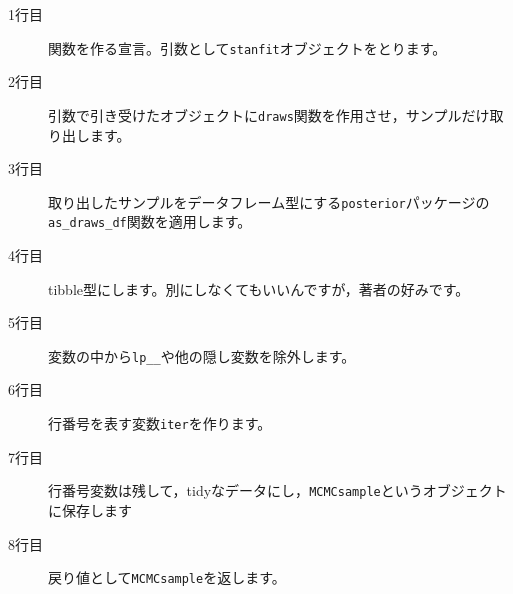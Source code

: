\begin{description}
	\item[1行目] 関数を作る宣言。引数として\verb|stanfit|オブジェクトをとります。
	\item[2行目] 引数で引き受けたオブジェクトに\verb|draws|関数を作用させ，サンプルだけ取り出します。
	\item[3行目] 取り出したサンプルをデータフレーム型にする\verb|posterior|パッケージの\verb|as_draws_df|関数を適用します。
	\item[4行目] tibble型にします。別にしなくてもいいんですが，著者の好みです。
	\item[5行目] 変数の中から\verb|lp__|や他の隠し変数を除外します。
	\item[6行目] 行番号を表す変数\verb|iter|を作ります。
	\item[7行目] 行番号変数は残して，tidyなデータにし，\verb|MCMCsample|というオブジェクトに保存します
	\item[8行目] 戻り値として\verb|MCMCsample|を返します。
\end{description}
